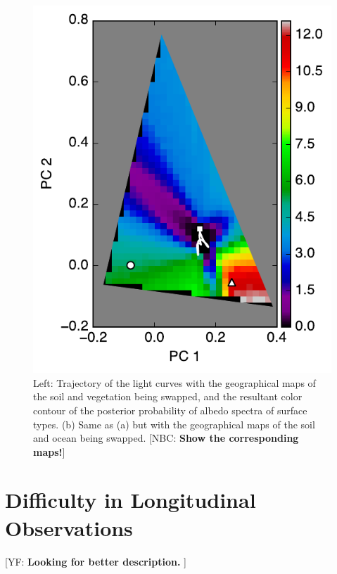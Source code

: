 \documentclass[iop,numberedappendix,apj,]{emulateapj}
\def\memoYF#1{\color{red}[YF: {\bf #1}]\color{black}}
\def\memoNBC#1{\color{blue}[NBC: {\bf #1}]\color{black}}
\begin{document}
\begin{figure}[tbh!]
\begin{center}
\begin{minipage}{0.33\hsize}
\includegraphics[width=\hsize]{mockdata_90deg_3types3_t360_lc_noreg.pdf}
     \end{minipage}
    \end{center}
    \caption{Left: Trajectory of the light curves with the geographical maps of the soil and vegetation being swapped, and the resultant color contour of the posterior probability of albedo spectra of surface types. (b) Same as (a) but with the geographical maps of the soil and ocean being swapped. \memoNBC{Show the corresponding maps!} }
\label{fig:swap}
\end{figure}


\section{Difficulty in Longitudinal Observations}

\memoYF{Looking for better description. }
\end{document}
